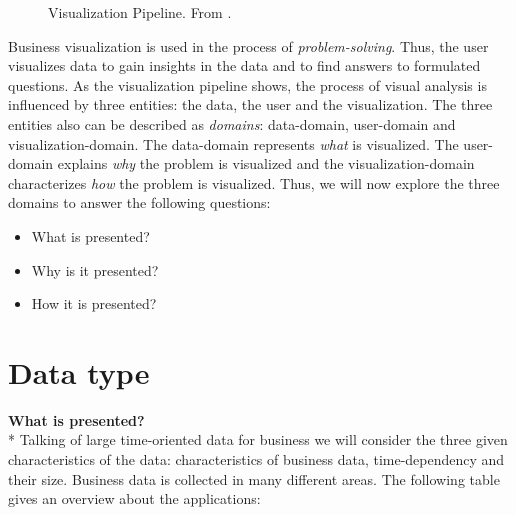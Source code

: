 \begin{figure}[H]
    \centering
    \caption{Visualization Pipeline. From \cite{Ware2012a}.}
    \label{fig:vispipeline}
\end{figure}

Business visualization is used in the process of \textit{problem-solving}\cite{Bacic2012}. Thus, the user visualizes data to gain insights in the data and to find answers to formulated questions.  
As the visualization pipeline shows, the process of visual analysis is influenced by three entities: the data, the user and the visualization.
The three entities also can be described as \textit{domains}: data-domain, user-domain and visualization-domain. The data-domain represents \textit{what} is visualized. The user-domain explains \textit{why} the problem is visualized and the visualization-domain characterizes \textit{how} the problem is visualized. Thus, we will now explore the three domains to answer the following questions: 

\begin{itemize}
    \item What is presented?
    \item Why is it presented?
    \item How it is presented?
\end{itemize}


\section{Data type} \label{data}

\textbf{What is presented?}\\*
Talking of large time-oriented data for business we will consider the three given characteristics of the data: characteristics of business data, time-dependency and their size. Business data is collected in many different areas. The following table gives an overview about the applications: 

